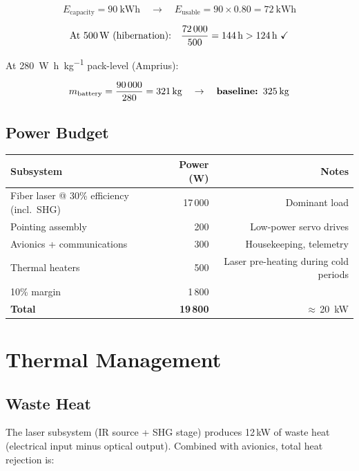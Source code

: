 \documentclass[12pt,letterpaper]{article}
\begin{document}
\[
  E_{\text{capacity}} = \SI{90}{\kilo\watt\hour}
  \quad \rightarrow \quad E_{\text{usable}} = 90 \times 0.80 = \SI{72}{\kilo\watt\hour}
\]

\[
  \text{At \SI{500}{\watt} (hibernation):}\quad
  \frac{72\,000}{500} = \SI{144}{\hour} > \SI{124}{\hour}\ \checkmark
\]

At \SI{280}{\watt\hour\per\kilo\gram} pack-level (Amprius):

\[
  m_{\text{battery}} = \frac{90\,000}{280} = \SI{321}{\kilo\gram}
    \quad \rightarrow \quad \textbf{baseline: \SI{325}{\kilo\gram}}
\]

\subsection{Power Budget}

\begin{center}
\begin{tabular}{lrr}
\toprule
\textbf{Subsystem} & \textbf{Power (W)} & \textbf{Notes} \\
\midrule
Fiber laser @ 30\% efficiency (incl.\ SHG) & 17\,000 & Dominant load \\
Pointing assembly & 200 & Low-power servo drives \\
Avionics + communications & 300 & Housekeeping, telemetry \\
Thermal heaters & 500 & Laser pre-heating during cold periods \\
10\% margin & 1\,800 & \\
\midrule
\textbf{Total} & \textbf{19\,800} & $\approx$\,\SI{20}{\kilo\watt} \\
\bottomrule
\end{tabular}
\end{center}

\section{Thermal Management}

\subsection{Waste Heat}

The laser subsystem (IR source + SHG stage) produces 12\,kW of waste heat
(electrical input minus optical output). Combined with avionics, total heat
rejection is:
\end{document}
